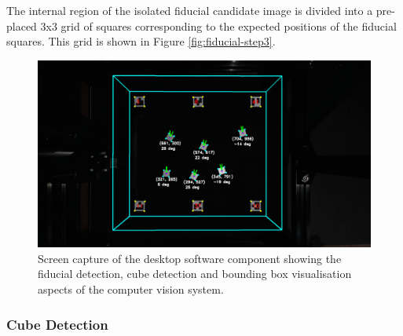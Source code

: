 The internal region of the isolated fiducial candidate image is divided into a pre-placed 3x3 grid of squares corresponding to the expected positions of the fiducial squares. This grid is shown in Figure \ref{fig:fiducial-step3}.


\begin{figure}[H]
	\centering
	\includegraphics[width=1\linewidth]{figures/computer-vision-overview.png}
	\caption{Screen capture of the desktop software component showing the fiducial detection, cube detection and bounding box visualisation aspects of the computer vision system.}
	\label{fig:computer-vision-overview}
\end{figure}

\subsubsection{Cube Detection} \label{Cube Detection}

